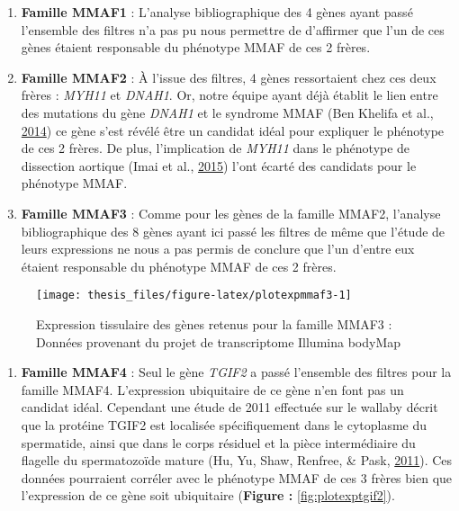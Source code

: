 \documentclass[12pt,twoside]{reedthesis}
\providecommand{\tightlist}{%
  \setlength{\itemsep}{0pt}\setlength{\parskip}{0pt}}
\theoremstyle{definition}
\theoremstyle{definition}
\theoremstyle{remark}
\begin{document}
  \begin{enumerate}
  \def\labelenumi{\arabic{enumi}.}
  \setcounter{enumi}{2}
  \tightlist
  \item
    \textbf{Famille MMAF1} : L'analyse bibliographique des 4 gènes ayant
    passé l'ensemble des filtres n'a pas pu nous permettre de d'affirmer
    que l'un de ces gènes étaient responsable du phénotype MMAF de ces 2
    frères.\\
  \item
    \textbf{Famille MMAF2} : À l'issue des filtres, 4 gènes ressortaient
    chez ces deux frères : \emph{MYH11} et \emph{DNAH1}. Or, notre équipe
    ayant déjà établit le lien entre des mutations du gène \emph{DNAH1} et
    le syndrome MMAF (Ben Khelifa et al.,
    \protect\hyperlink{ref-BenKhelifa2014}{2014}) ce gène s'est révélé
    être un candidat idéal pour expliquer le phénotype de ces 2 frères. De
    plus, l'implication de \emph{MYH11} dans le phénotype de dissection
    aortique (Imai et al., \protect\hyperlink{ref-Imai2015}{2015}) l'ont
    écarté des candidats pour le phénotype MMAF.\\
  \item
    \textbf{Famille MMAF3} : Comme pour les gènes de la famille MMAF2,
    l'analyse bibliographique des 8 gènes ayant ici passé les filtres de
    même que l'étude de leurs expressions ne nous a pas permis de conclure
    que l'un d'entre eux étaient responsable du phénotype MMAF de ces 2
    frères. \newpage
  \end{enumerate}
  
  \begin{figure}
  
  {\centering \texttt{[image: thesis\_files/figure-latex/plotexpmmaf3-1]} 
  
  }
  
  \caption[Expression tissulaire des gènes retenus pour la famille MMAF3]{Expression tissulaire des gènes retenus pour la famille MMAF3 : Données provenant du projet de transcriptome Illumina bodyMap}\label{fig:plotexpmmaf3}
  \end{figure}
  
  \begin{enumerate}
  \def\labelenumi{\arabic{enumi}.}
  \setcounter{enumi}{5}
  \tightlist
  \item
    \textbf{Famille MMAF4} : Seul le gène \emph{TGIF2} a passé l'ensemble
    des filtres pour la famille MMAF4. L'expression ubiquitaire de ce gène
    n'en font pas un candidat idéal. Cependant une étude de 2011 effectuée
    sur le wallaby décrit que la protéine TGIF2 est localisée
    spécifiquement dans le cytoplasme du spermatide, ainsi que dans le
    corps résiduel et la pièce intermédiaire du flagelle du spermatozoïde
    mature (Hu, Yu, Shaw, Renfree, \& Pask,
    \protect\hyperlink{ref-Hu2011}{2011}). Ces données pourraient corréler
    avec le phénotype MMAF de ces 3 frères bien que l'expression de ce
    gène soit ubiquitaire (\textbf{Figure : }\ref{fig:plotexptgif2}).
  \end{enumerate}
  
\end{document}
